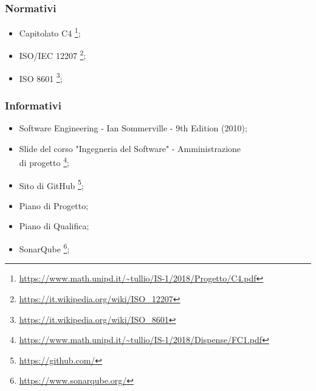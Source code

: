 \subsubsection{Normativi}
\begin{itemize}
	\item Capitolato C4
	\footnote{\url{https://www.math.unipd.it/~tullio/IS-1/2018/Progetto/C4.pdf}};
	
	\item ISO/IEC 12207
	\footnote{\url{https://it.wikipedia.org/wiki/ISO_12207}};
	
	\item ISO 8601
	\footnote{\url{https://it.wikipedia.org/wiki/ISO_8601}};
\end{itemize}
\subsubsection{Informativi}
\begin{itemize}
	\item Software Engineering - Ian Sommerville - 9th Edition (2010);
	
	\item Slide del corso "Ingegneria del Software" - Amministrazione\\ di progetto
	\footnote{\url{https://www.math.unipd.it/~tullio/IS-1/2018/Dispense/FC1.pdf}};
	
	\item Sito di GitHub
	\footnote{\url{https://github.com/}};
	
	\item Piano di Progetto;
	\item Piano di Qualifica;
	
	\item SonarQube
	\footnote{\url{https://www.sonarqube.org/}};
\end{itemize}
\newpage
